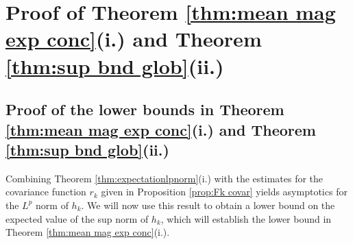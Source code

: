 \documentclass[12pt, a4paper]{amsart}
\theoremstyle{definition}
\newcommand {\1} {\mathbf{1}}
\numberwithin{equation}{section}
\begin{document}
\section{Proof of Theorem \ref{thm:mean mag exp conc}\texorpdfstring{(i.)}{(i.)} and Theorem \ref{thm:sup bnd glob}\texorpdfstring{(ii.)}{(ii.)}} \label{sec:proofs mean}

\subsection{Proof of the lower bounds in Theorem \ref{thm:mean mag exp conc}\texorpdfstring{(i.)}{(i.)} and Theorem \ref{thm:sup bnd glob}\texorpdfstring{(ii.)}{(ii.)}} Combining Theorem \ref{thm:expectationlpnorm}(i.) with the estimates for the covariance function $r_k$ given in Proposition \ref{prop:Fk covar} yields asymptotics for the $L^p$ norm of $h_k$. We will now use this result to obtain a lower bound on the expected value of the sup norm of $h_k$, which will establish the lower bound in Theorem \ref{thm:mean mag exp conc}(i.).
\end{document}
